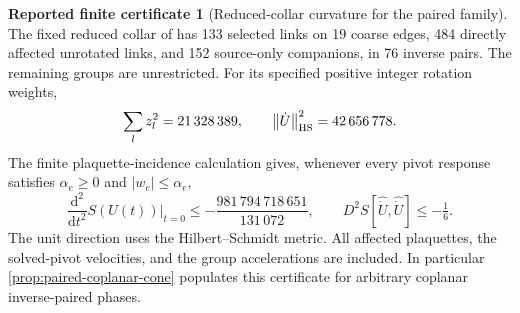 \documentclass[11pt,oneside,openany]{book}
\theoremstyle{definition}
\newtheorem{certificate}[certificate]{Reported finite certificate}
\theoremstyle{remark}
\newcommand{\dd}{\mathrm d}
\newcommand{\norm}[1]{\left\lVert#1\right\rVert}
\newcommand{\src}[2]{\cite[#2]{#1}}
\begin{document}
\begin{certificate}[Reduced-collar curvature for the paired family]
\label{cert:paired-transition-curvature}
The fixed reduced collar of \src{F14}{V5--V11} has 133 selected links
on 19 coarse edges, 484 directly affected unrotated links, and 152
source-only companions, in 76 inverse pairs. The remaining groups
are unrestricted. For its specified positive integer rotation weights,
\[
 \sum_lz_l^2=21\,328\,389,\qquad
                \norm{\dot U}_{\rm HS}^2=42\,656\,778.
\]
The finite plaquette-incidence calculation gives, whenever every pivot
response satisfies $\alpha_e\ge0$ and $|w_e|\le\alpha_e$,
\begin{equation}
 \frac{\dd^2}{\dd t^2}S(U(t))\bigg|_{t=0}
       \le-\frac{981\,794\,718\,651}{131\,072},\qquad
            D^2S[\widehat{\dot U},\widehat{\dot U}]\le-\tfrac16.
 \label{eq:paired-transition-curvature}
\end{equation}
The unit direction uses the Hilbert--Schmidt metric. All affected
plaquettes, the solved-pivot velocities, and the group accelerations
are included. In particular \cref{prop:paired-coplanar-cone} populates
this certificate for arbitrary coplanar inverse-paired phases.
\end{certificate}
\end{document}
